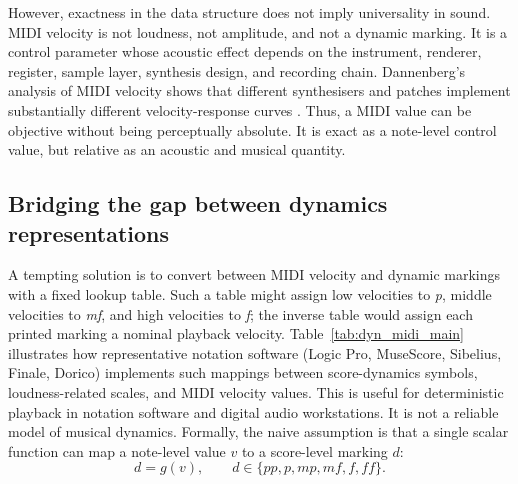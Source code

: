However, exactness in the data structure does not imply universality in sound. MIDI velocity is not loudness, not amplitude, and not a dynamic marking. It is a control parameter whose acoustic effect depends on the instrument, renderer, register, sample layer, synthesis design, and recording chain. Dannenberg's analysis of MIDI velocity shows that different synthesisers and patches implement substantially different velocity-response curves \cite{dan2006psy}. Thus, a MIDI value can be objective without being perceptually absolute. It is exact as a note-level control value, but relative as an acoustic and musical quantity.

\subsection{Bridging the gap between dynamics representations}
\label{sec:bg:dynamics_bridge}

A tempting solution is to convert between MIDI velocity and dynamic markings with a fixed lookup table. Such a table might assign low velocities to \textit{p}, middle velocities to \textit{mf}, and high velocities to \textit{f}; the inverse table would assign each printed marking a nominal playback velocity. Table~\ref{tab:dyn_midi_main} illustrates how representative notation software (Logic Pro, MuseScore, Sibelius, Finale, Dorico) implements such mappings between score-dynamics symbols, loudness-related scales, and MIDI velocity values. This is useful for deterministic playback in notation software and digital audio workstations. It is not a reliable model of musical dynamics. Formally, the naive assumption is that a single scalar function can map a note-level value $v$ to a score-level marking $d$:
\begin{equation}
d = g(v), \qquad
d \in \{\textit{pp}, \textit{p}, \textit{mp}, \textit{mf}, \textit{f}, \textit{ff}\}.
\label{eq:bg_velocity_to_dynamic_naive}
\end{equation}


